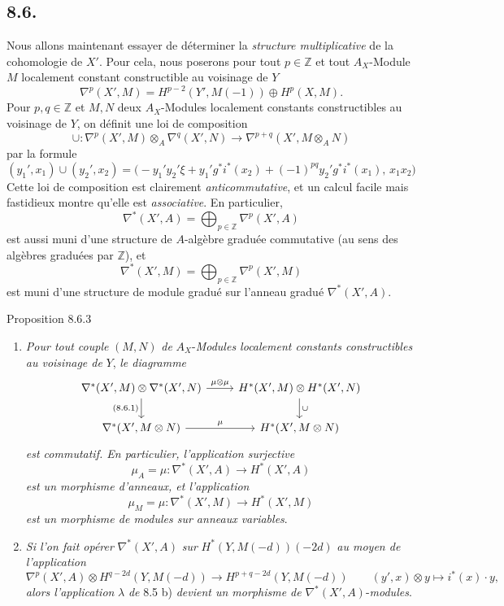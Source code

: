 \subsection*{8.6.}

Nous allons maintenant essayer de déterminer la \emph{structure multiplicative} de la cohomologie de $X'$. Pour cela, nous poserons pour tout $p\in\mathbb{Z}$ et tout $A_X$-Module $M$ localement constant constructible au voisinage de $Y$
\[
\nabla^p(X',M)=H^{p-2}(Y',M(-1))\oplus H^p(X,M).
\]
Pour $p,q\in\mathbb{Z}$ et $M,N$ deux $A_X$-Modules localement constants constructibles au voisinage de $Y$, on définit une loi de composition
\[
\cup:\nabla^p(X',M)\otimes_A\nabla^q(X',N)\to
\nabla^{p+q}(X',M\otimes_A N)
\tag{8.6.1}
\]
par la formule
\[
(y_1',x_1)\cup(y_2',x_2)=
\bigl(-y_1'y_2'\xi+y_1'g^*i^*(x_2)+(-1)^{pq}y_2'g^*i^*(x_1),\,x_1x_2\bigr)
\tag{8.6.2}
\]
Cette loi de composition est clairement \emph{anticommutative}, et un calcul facile mais fastidieux montre qu'elle est \emph{associative}. En particulier,
\[
\nabla^*(X',A)=\bigoplus_{p\in\mathbb{Z}}\nabla^p(X',A)
\]
est
aussi muni d'une structure de $A$-algèbre graduée commutative (au sens des algèbres graduées par $\mathbb{Z}$), et
\[
\nabla^*(X',M)=\bigoplus_{p\in\mathbb{Z}}\nabla^p(X',M)
\]
est muni d'une structure de module gradué sur l'anneau gradué $\nabla^*(X',A)$.

\begin{statement}{Proposition 8.6.3}
\begin{enumerate}[label=\alph*)]
\item \emph{Pour tout couple} $(M,N)$ \emph{de} $A_X$-\emph{Modules localement constants constructibles au voisinage de} $Y$, \emph{le diagramme}
\[
\begin{tikzcd}
\nabla^*(X',M)\otimes\nabla^*(X',N)\arrow[r,"\mu\otimes\mu"]\arrow[d,"{(8.6.1)}"']&
H^*(X',M)\otimes H^*(X',N)\arrow[d,"\cup"]\\
\nabla^*(X',M\otimes N)\arrow[r,"\mu"]&
H^*(X',M\otimes N)
\end{tikzcd}
\]
\emph{est commutatif. En particulier, l'application surjective}
\[
\mu_A=\mu:\nabla^*(X',A)\to H^*(X',A)
\]
\emph{est un morphisme d'anneaux, et l'application}
\[
\mu_M=\mu:\nabla^*(X',M)\to H^*(X',M)
\]
\emph{est un morphisme de modules sur anneaux variables}.
\item \emph{Si l'on fait opérer} $\nabla^*(X',A)$ \emph{sur} $H^*(Y,M(-d))(-2d)$ \emph{au moyen de l'application}
\[
\nabla^p(X',A)\otimes H^{q-2d}(Y,M(-d))
\to H^{p+q-2d}(Y,M(-d))
\qquad
(y',x)\otimes y\mapsto i^*(x)\cdot y,
\]
\emph{alors l'application} $\lambda$ \emph{de} 8.5 b) \emph{devient un morphisme de} $\nabla^*(X',A)$-\emph{modules}.
\end{enumerate}
\end{statement}

